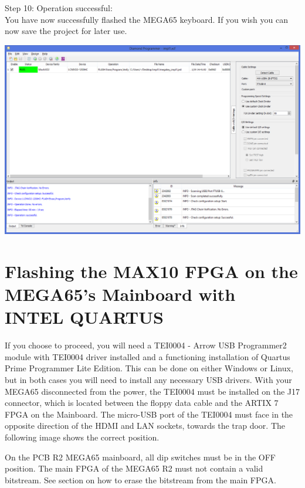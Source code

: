 \begin{minipage}{\linewidth}
Step 10: Operation successful: \\
You have now successfully flashed the MEGA65 keyboard.
If you wish you can now save the project for later use.
  \begin{center}
  \includegraphics[width=0.8\linewidth]{images/diamond10.png}
  \end{center}
\end{minipage}


\section{Flashing the MAX10 FPGA on the MEGA65's Mainboard with INTEL QUARTUS}

If you choose to proceed, you will need a TEI0004 - Arrow USB Programmer2 module with TEI0004 driver installed
and a functioning installation of Quartus Prime Programmer Lite Edition.  This can be done on either Windows
or Linux, but in both cases you will need to install any necessary USB drivers.
With your MEGA65 disconnected from the power, the TEI0004 must be installed on the J17 connector,
which is located between the floppy data cable and the ARTIX 7 FPGA on the Mainboard.
The micro-USB port of the TEI0004 must face in the opposite direction of the HDMI and LAN sockets, towards
the trap door.
The following image shows the correct position.

On the PCB R2 MEGA65 mainboard, all dip switches must be in the OFF position. The main FPGA of the MEGA65 R2 must not contain
a valid bitstream. See section  on how to erase the bitstream
from the main FPGA.

